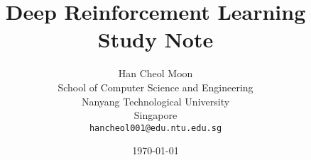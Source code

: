 \documentclass[oneside,a4paper,11pt]{book}
\begin{document}
\author{%
	Han Cheol Moon\\
	School of Computer Science and Engineering\\
	Nanyang Technological University\\
	Singapore\\
	\texttt{hancheol001@edu.ntu.edu.sg}
}
\title{Deep Reinforcement Learning Study Note}
\date{\today}

\frontmatter
\maketitle
\tableofcontents
\newpage

\mainmatter






%



\backmatter




\appendix

\end{document}
